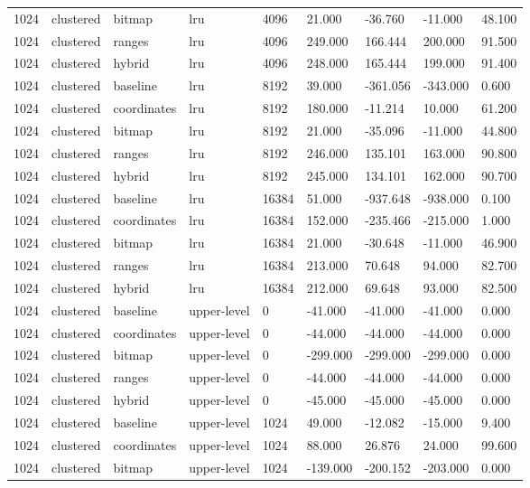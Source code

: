 \begin{tabular}{lllllllll}
1024 & clustered & bitmap & lru & 4096 & 21.000 & -36.760 & -11.000 & 48.100 \\
1024 & clustered & ranges & lru & 4096 & 249.000 & 166.444 & 200.000 & 91.500 \\
1024 & clustered & hybrid & lru & 4096 & 248.000 & 165.444 & 199.000 & 91.400 \\
1024 & clustered & baseline & lru & 8192 & 39.000 & -361.056 & -343.000 & 0.600 \\
1024 & clustered & coordinates & lru & 8192 & 180.000 & -11.214 & 10.000 & 61.200 \\
1024 & clustered & bitmap & lru & 8192 & 21.000 & -35.096 & -11.000 & 44.800 \\
1024 & clustered & ranges & lru & 8192 & 246.000 & 135.101 & 163.000 & 90.800 \\
1024 & clustered & hybrid & lru & 8192 & 245.000 & 134.101 & 162.000 & 90.700 \\
1024 & clustered & baseline & lru & 16384 & 51.000 & -937.648 & -938.000 & 0.100 \\
1024 & clustered & coordinates & lru & 16384 & 152.000 & -235.466 & -215.000 & 1.000 \\
1024 & clustered & bitmap & lru & 16384 & 21.000 & -30.648 & -11.000 & 46.900 \\
1024 & clustered & ranges & lru & 16384 & 213.000 & 70.648 & 94.000 & 82.700 \\
1024 & clustered & hybrid & lru & 16384 & 212.000 & 69.648 & 93.000 & 82.500 \\
1024 & clustered & baseline & upper-level & 0 & -41.000 & -41.000 & -41.000 & 0.000 \\
1024 & clustered & coordinates & upper-level & 0 & -44.000 & -44.000 & -44.000 & 0.000 \\
1024 & clustered & bitmap & upper-level & 0 & -299.000 & -299.000 & -299.000 & 0.000 \\
1024 & clustered & ranges & upper-level & 0 & -44.000 & -44.000 & -44.000 & 0.000 \\
1024 & clustered & hybrid & upper-level & 0 & -45.000 & -45.000 & -45.000 & 0.000 \\
1024 & clustered & baseline & upper-level & 1024 & 49.000 & -12.082 & -15.000 & 9.400 \\
1024 & clustered & coordinates & upper-level & 1024 & 88.000 & 26.876 & 24.000 & 99.600 \\
1024 & clustered & bitmap & upper-level & 1024 & -139.000 & -200.152 & -203.000 & 0.000 \\

\end{tabular}
